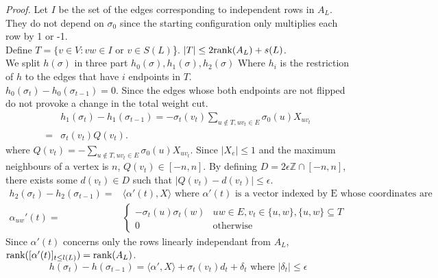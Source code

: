 \textit{Proof.} Let $I$ be the set of the edges corresponding to independent rows in $A_L$. They do not depend on $\sigma_0$ since the starting configuration only multiplies each row by 1 or -1.\\
Define $T = \{v \in V: vw \in I \text{ or } v \in S(L)$\}. $|T| \leq 2 \text{rank}(A_L) + s(L)$. \\
We split $h(\sigma)$ in three part $h_0(\sigma), h_1(\sigma), h_2(\sigma)$ Where $h_i$ is the restriction of $h$ to the edges that have $i$ endpoints in $T$. \\
$h_0(\sigma_t) - h_0(\sigma_{t -1}) = 0$. Since the edges whose both endpoints are not flipped do not provoke a change in the total weight cut. \\
\begin{equation*}
\begin{split}
&h_1(\sigma_t) - h_1(\sigma_{t-1}) = -\sigma_t(v_t)\sum_{u \not\in T, uv_t \in E}\sigma_0(u)X_{uv_t} \\
=& \sigma_t(v_t)Q(v_t).
\end{split}
\end{equation*}
where $Q(v_t) = -\sum_{u \not\in T, uv_t \in E}\sigma_0(u)X_{uv_t}$. Since $|X_e| \leq 1$ and the maximum neighbours of a vertex is $n$, $Q(v_t) \in [-n, n]$. By defining $D = 2\epsilon\mathbb Z \cap [-n, n]$, there exists some $d(v_t) \in D$ such that $|Q(v_t) - d(v_t)| \leq \epsilon$.\\
\begin{equation*}
\begin{split}
h_2(\sigma_t) - h_2(\sigma_{t-1}) = &\langle\alpha '(t), X \rangle \text{ where $\alpha '(t)$ is a vector indexed by E whose coordinates are }\\
\alpha_{uw} '(t) =  &
\begin{cases}
-\sigma_t(u)\sigma_t(w) & uw \in E, v_t \in \{u, w\}, \{u, w\} \subseteq T \\
0 & \text{otherwise}
\end{cases}
\end{split}
\end{equation*}
Since $\alpha '(t)$ concerns only the rows linearly independant from $A_L$, $\text{rank}([\alpha '(t)]_{t \leq l(L)}) = \text{rank}(A_L)$. \\
\begin{equation*}
h(\sigma_t) - h(\sigma_{t-1}) = \langle\alpha ', X \rangle +   \sigma_t(v_t)d_t + \delta_t \text{    where }|\delta_t| \leq \epsilon
\end{equation*}

